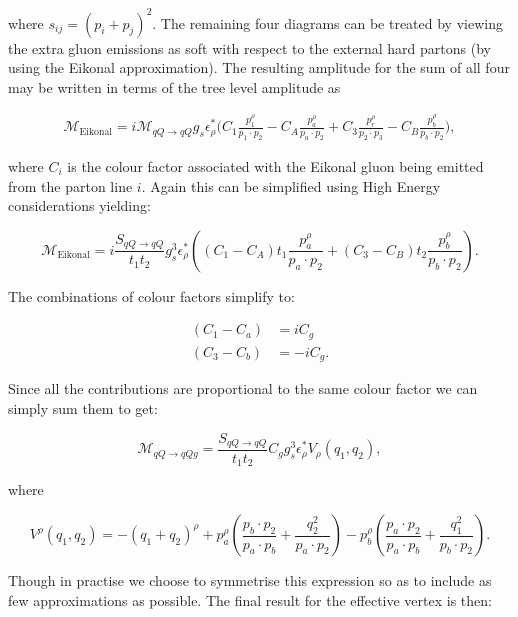 		where $s_{ij} = (p_i + p_j)^2$.  The remaining four diagrams can be treated by viewing the extra gluon emissions as soft with
		respect to the external hard partons (by using the Eikonal approximation).  The resulting
		amplitude for the sum of all four may be written in terms of the tree level amplitude as

		\begin{align}
			\mathcal{M}_{\text{Eikonal}} = i\mathcal{M}_{qQ\rightarrow qQ}g_s\epsilon^*_\rho
			\Big(C_1\frac{p_1^\rho}{p_1\cdot p_2} - C_A\frac{p_a^\rho}{p_a\cdot p_2}
			+ C_3\frac{p_r^\rho}{p_2\cdot p_3} - C_B\frac{p_b^\rho}{p_b\cdot p_2}\Big),
		\end{align}

		where $C_i$ is the colour factor associated with the Eikonal gluon being emitted from the
		parton line $i$.  Again this can be simplified using High Energy considerations yielding:

		\begin{equation}
			\mathcal{M}_{\text{Eikonal}} = i\frac{S_{qQ\rightarrow qQ}}{t_1t_2}g_s^3\epsilon^*_\rho
			\left((C_1-C_A)t_1\frac{p_a^\rho}{p_a\cdot p_2} + (C_3-C_B)t_2\frac{p_b^\rho}{p_b\cdot p_2}\right).
		\end{equation}

		The combinations of colour factors simplify to:

		\begin{align}
			(C_1 - C_a) &=  iC_g \\
			(C_3 - C_b) &= -iC_g.
		\end{align}

		Since all the contributions are proportional to the same colour factor we can simply sum
		them to get:

		\begin{equation}
			\mathcal{M}_{qQ\rightarrow qQg} = \frac{S_{qQ\rightarrow qQ}}{t_1t_2}C_gg_s^3\epsilon^*_\rho V_\rho(q_1, q_2),
		\end{equation}

		where

		\begin{equation}
			V^\rho(q_1, q_2) = -(q_1 + q_2)^\rho +
			p_a^\rho\left(\frac{p_b\cdot p_2}{p_a\cdot p_b} + \frac{q^2_2}{p_a\cdot p_2}\right) -
			p_b^\rho\left(\frac{p_a\cdot p_2}{p_a\cdot p_b} + \frac{q^2_1}{p_b\cdot p_2}\right).
			\label{eqn:unsymm}
		\end{equation}

		Though in practise we choose to symmetrise this expression so as to include as few
		approximations as possible.  The final result for the effective vertex is then:


